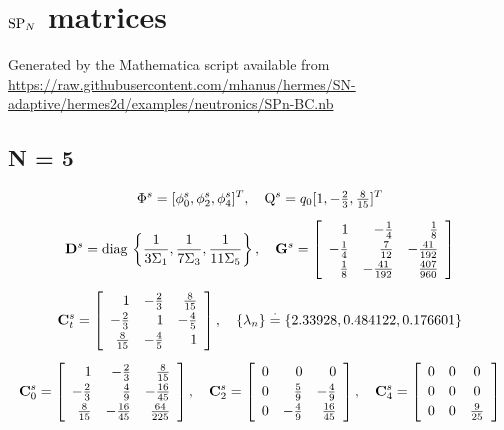 \chapter{$\text{SP}_{N}$ matrices}\label{app:SPN}
Generated by the Mathematica script available from
\url{https://raw.githubusercontent.com/mhanus/hermes/SN-adaptive/hermes2d/examples/neutronics/SPn-BC.nb}
\section{N = 5}
$$
\begin{gathered}
\Phi^s = [\phi^s_0, \phi^s_2, \phi^s_4]^T,\quad \mathrm{Q}^s = q_0[1, -\tfrac{2}{3}, \tfrac{8}{15}]^T\\[.5em]
\mathbf{D}^s = \operatorname{diag\,} \left\{\frac{1}{3\Sigma_1}, \frac{1}{7\Sigma_3}, \frac{1}{11\Sigma_5}\right\},\quad
\mathbf{G}^s = \left[
\begin{array}{rrr}
 1 & -\frac{1}{4} & \frac{1}{8} \\[.2em]
 -\frac{1}{4} & \frac{7}{12} & -\frac{41}{192} \\[.2em]
 \frac{1}{8} & -\frac{41}{192} & \frac{407}{960} \\
\end{array}
\right]\\[.5em]
\mathbf{C}^s_t = \left[
\begin{array}{rrr}
 1 & -\frac{2}{3} & \frac{8}{15} \\[.2em]
 -\frac{2}{3} & 1 & -\frac{4}{5} \\[.2em]
 \frac{8}{15} & -\frac{4}{5} & 1 \\
\end{array}
\right],\quad \{\lambda_n\} \stackrel{\cdot}{=} \{2.33928,0.484122,0.176601\}\\[.5em]
\mathbf{C}^s_0 = \left[
\begin{array}{rrr}
 1 & -\frac{2}{3} & \frac{8}{15} \\[.2em]
 -\frac{2}{3} & \frac{4}{9} & -\frac{16}{45} \\[.2em]
 \frac{8}{15} & -\frac{16}{45} & \frac{64}{225}
\end{array}
\right],\quad
\mathbf{C}^s_2 = \left[
\begin{array}{rrr}
 0 & 0 & 0 \\[.2em]
 0 & \frac{5}{9} & -\frac{4}{9} \\[.2em]
 0 & -\frac{4}{9} & \frac{16}{45} \\
\end{array}
\right],\quad
\mathbf{C}^s_4 = \left[
\begin{array}{ccc}
 0 & 0 & 0 \\[.2em]
 0 & 0 & 0 \\[.2em]
 0 & 0 & \frac{9}{25} \\
\end{array}
\right]
\end{gathered}
$$

